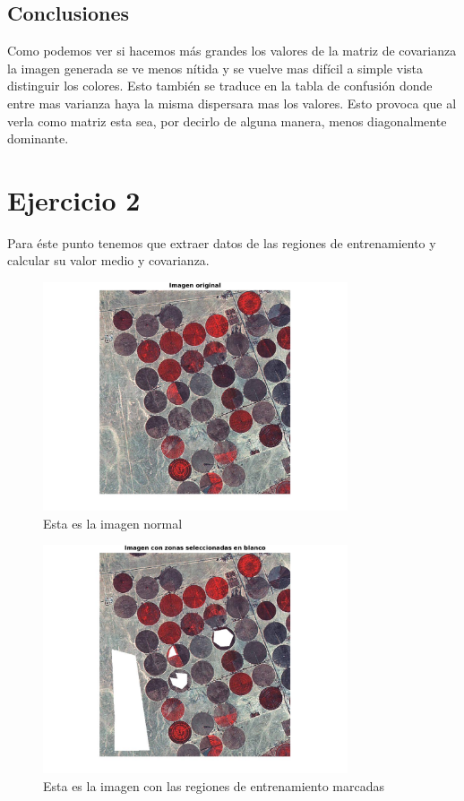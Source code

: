 \documentclass[a4paper,10pt]{article}
\begin{document}
\subsection{Conclusiones}
Como podemos ver si hacemos m\'as grandes los valores de la matriz de covarianza la imagen generada se ve menos n\'itida y se vuelve mas dif\'icil a simple vista distinguir los colores. Esto tambi\'en se traduce en la tabla de confusi\'on donde entre mas varianza haya la misma dispersara mas los valores. Esto provoca que al verla como matriz esta sea, por decirlo de alguna manera, menos diagonalmente dominante.


\section{Ejercicio 2}
Para \'este punto tenemos que extraer datos de las regiones de entrenamiento y calcular su valor medio y covarianza.

\begin{figure}[H]
\centering
\includegraphics[width=90mm]{ImagenNormal.jpg}
\caption{Esta es la imagen normal}
\end{figure}

\begin{figure}[H]
\centering
\includegraphics[width=90mm]{imagenBlanco.jpg}
\caption{Esta es la imagen con las regiones de entrenamiento marcadas}
\end{figure}
\end{document}
